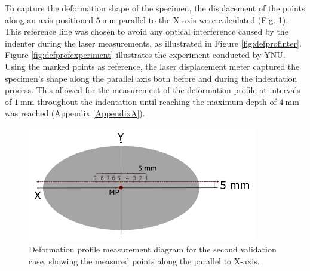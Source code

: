 To capture the deformation shape of the specimen, the displacement of the points along an axis positioned 
$\SI{5}{\milli \meter}$ parallel to the X-axis were calculated (Fig. \ref{fig:defprofdiagram}). %
This reference line was chosen to avoid any optical interference caused by the indenter during the 
laser measurements, as illustrated in Figure \ref{fig:defprofinter}.
Figure \ref{fig:defprofexperiment} illustrates the experiment conducted by YNU.
Using the marked points as reference, the laser displacement meter captured the specimen's 
shape along the parallel axis both before and during the indentation process.
This allowed for the measurement of the deformation profile at intervals of $\SI{1}{\milli \meter}$
throughout the indentation until reaching the maximum depth of $\SI{4}{\milli \meter}$ was reached (Appendix \ref{AppendixA}).\\

\begin{figure}%
	\centering
   \quad
   \includegraphics[width=10cm]{Images/validationcase/defprof/defprofdiag.png}%
   \caption[Deformation profile - Diagram]{Deformation profile measurement diagram for the second validation case, showing the measured points along the parallel to X-axis.}%
   \label{fig:defprofdiagram}%
\end{figure}

